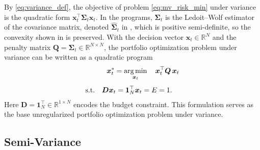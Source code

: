 By \eqref{eq:variance_def}, the objective of problem \eqref{eq:mv_risk_min} under variance is the quadratic form
$\bm{x}_t^\top \bm{\Sigma}_t \bm{x}_t$. In the programs, $\bm{\Sigma}_t$ is the Ledoit--Wolf estimator of the covariance
matrix, denoted $\hat{\bm{\Sigma}}_t$ in , which is positive semi-definite, so the convexity
shown in  is preserved. With the decision vector $\bm{x}_t \in \mathbb{R}^N$ and the penalty matrix
$\bm{Q} = \bm{\Sigma}_t \in \mathbb{R}^{N \times N}$, the portfolio optimization problem under
variance can be written as a quadratic program
\begin{equation} \label{eq:var_base_qp}
\begin{aligned}
    & \ \ \bm{x}_t^* = \operatorname*{arg\,min}_{\bm{x}_t} \quad
     \bm{x}_t^\top \bm{Q}\, \bm{x}_t \\[4pt]
    \text{s.t.} \quad
    & \bm{D} \bm{x}_t = \bm{1}_N^\top \bm{x}_t = E = 1.
\end{aligned}
\end{equation}
Here $\bm{D} = \bm{1}_N^\top \in \mathbb{R}^{1 \times N}$ encodes the budget constraint. This formulation serves as the base unregularized portfolio optimization problem under variance.

\subsection{Semi-Variance} \label{app:mv_svar_qp}

